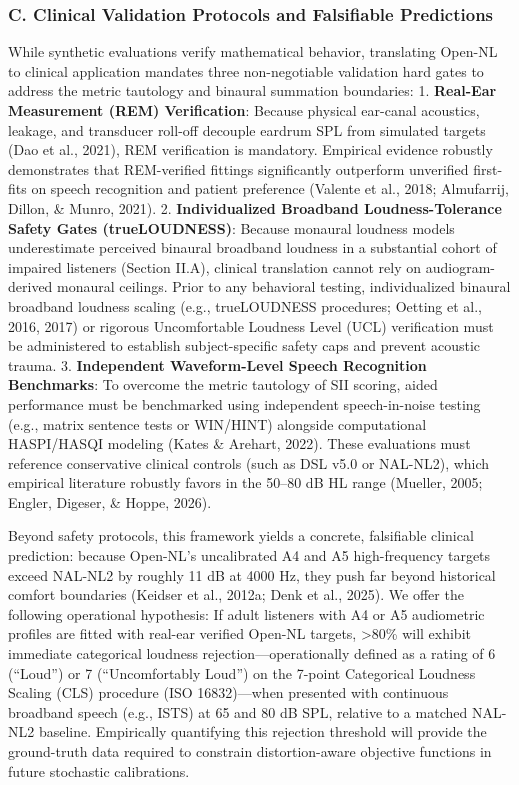 \documentclass[
  12pt,
]{article}
\begin{document}
\subsubsection{C. Clinical Validation Protocols and Falsifiable
Predictions}\label{c.-clinical-validation-protocols-and-falsifiable-predictions}

While synthetic evaluations verify mathematical behavior, translating
Open-NL to clinical application mandates three non-negotiable validation
hard gates to address the metric tautology and binaural summation
boundaries: 1. \textbf{Real-Ear Measurement (REM) Verification}: Because
physical ear-canal acoustics, leakage, and transducer roll-off decouple
eardrum SPL from simulated targets (Dao et al., 2021), REM verification
is mandatory. Empirical evidence robustly demonstrates that REM-verified
fittings significantly outperform unverified first-fits on speech
recognition and patient preference (Valente et al., 2018; Almufarrij,
Dillon, \& Munro, 2021). 2. \textbf{Individualized Broadband
Loudness-Tolerance Safety Gates (trueLOUDNESS)}: Because monaural
loudness models underestimate perceived binaural broadband loudness in a
substantial cohort of impaired listeners (Section II.A), clinical
translation cannot rely on audiogram-derived monaural ceilings. Prior to
any behavioral testing, individualized binaural broadband loudness
scaling (e.g., trueLOUDNESS procedures; Oetting et al., 2016, 2017) or
rigorous Uncomfortable Loudness Level (UCL) verification must be
administered to establish subject-specific safety caps and prevent
acoustic trauma. 3. \textbf{Independent Waveform-Level Speech
Recognition Benchmarks}: To overcome the metric tautology of SII
scoring, aided performance must be benchmarked using independent
speech-in-noise testing (e.g., matrix sentence tests or WIN/HINT)
alongside computational HASPI/HASQI modeling (Kates \& Arehart, 2022).
These evaluations must reference conservative clinical controls (such as
DSL v5.0 or NAL-NL2), which empirical literature robustly favors in the
50--80 dB HL range (Mueller, 2005; Engler, Digeser, \& Hoppe, 2026).

Beyond safety protocols, this framework yields a concrete, falsifiable
clinical prediction: because Open-NL's uncalibrated A4 and A5
high-frequency targets exceed NAL-NL2 by roughly 11 dB at 4000 Hz, they
push far beyond historical comfort boundaries (Keidser et al., 2012a;
Denk et al., 2025). We offer the following operational hypothesis: If
adult listeners with A4 or A5 audiometric profiles are fitted with
real-ear verified Open-NL targets, \textgreater80\% will exhibit
immediate categorical loudness rejection---operationally defined as a
rating of 6 (``Loud'') or 7 (``Uncomfortably Loud'') on the 7-point
Categorical Loudness Scaling (CLS) procedure (ISO 16832)---when
presented with continuous broadband speech (e.g., ISTS) at 65 and 80 dB
SPL, relative to a matched NAL-NL2 baseline. Empirically quantifying
this rejection threshold will provide the ground-truth data required to
constrain distortion-aware objective functions in future stochastic
calibrations.
\end{document}
